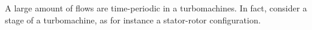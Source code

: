
A large amount of flows are time-periodic in a turbomachines.
In fact, consider a stage of a turbomachine, as for instance
a stator-rotor configuration.